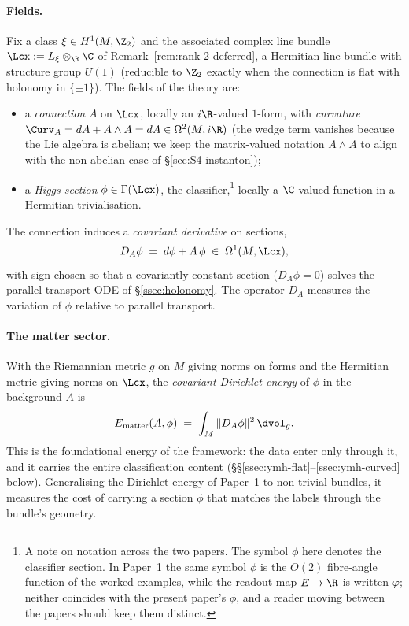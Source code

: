 \paragraph{Fields.} Fix a class $\xi\in H^1(M,\Z_2)$ and the
associated complex line bundle $\Lcx:=L_\xi\otimes_\R\C$ of
Remark~\ref{rem:rank-2-deferred}, a Hermitian line bundle with
structure group $U(1)$ (reducible to $\Z_2$ exactly when the
connection is flat with holonomy in $\{\pm 1\}$). The fields of the
theory are:
\begin{itemize}[leftmargin=2em]
\item a \emph{connection} $A$ on $\Lcx$, locally an
$i\R$-valued $1$-form, with \emph{curvature} $\Curv_A=dA+A\wedge A=dA
\in\Omega^2(M,i\R)$ (the wedge term vanishes because the Lie algebra
is abelian; we keep the matrix-valued notation $A\wedge A$ to align
with the non-abelian case of \S\ref{sec:S4-instanton});
\item a \emph{Higgs section} $\phi\in\Gamma(\Lcx)$, the
classifier,\footnote{A note on notation across the two papers. The
symbol $\phi$ here denotes the classifier section. In Paper~1
\cite{Vasii2026Paper1} the same symbol $\phi$ is the $O(2)$
fibre-angle function of the worked examples, while the readout map
$E\to\R$ is written $\varphi$; neither coincides with the present
paper's $\phi$, and a reader moving between the papers should keep
them distinct.}
locally a $\C$-valued function in a Hermitian trivialisation.
\end{itemize}
The connection induces a \emph{covariant derivative} on sections,
\[
   D_A\phi \;=\; d\phi + A\,\phi \;\in\; \Omega^1(M,\Lcx),
\]
with sign chosen so that a covariantly constant section ($D_A\phi=0$)
solves the parallel-transport ODE of \S\ref{ssec:holonomy}. The
operator $D_A$ measures the variation of $\phi$ relative to parallel
transport.

\paragraph{The matter sector.} With the Riemannian metric $g$ on $M$
giving norms on forms and the Hermitian metric giving norms on
$\Lcx$, the \emph{covariant Dirichlet energy} of $\phi$ in the
background $A$ is
\[
   E_{\mathrm{matter}}(A,\phi) \;=\;
   \int_M \|D_A\phi\|^2\,\dvol_g.
\]
This is the foundational energy of the framework: the data enter
only through it, and it carries the entire classification content
(\S\S\ref{ssec:ymh-flat}--\ref{ssec:ymh-curved} below).
Generalising the Dirichlet energy of Paper~1
\cite[Theorem~13.3]{Vasii2026Paper1} to non-trivial bundles, it measures
the cost of carrying a section $\phi$ that matches the labels through
the bundle's geometry.

